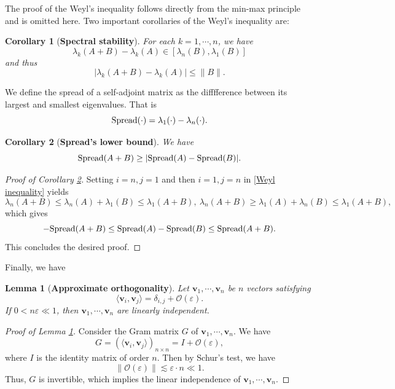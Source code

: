 \documentclass[11pt,reqno,UTF8,twoside]{amsart}
\newcommand{\bfv}{\mathbf{v}}
\newcommand{\spread}{{\rm Spread}}
\newcommand{\mcO}{\mathcal{O}}
\newtheorem{lem}[thm]{Lemma}
\newtheorem{cor}{\bf Corollary}[section]
\theoremstyle{definition}
\numberwithin{equation}{section}
\begin{document}
The proof of  the Weyl's inequality follows directly from the min-max principle  and is omitted here. Two important corollaries of  the Weyl's inequality are:
\begin{cor}[{\bf Spectral stability}]\label{Spectral stability lemma}
For each \(k = 1, \cdots, n\), we have
\[
\lambda_k(A + B) - \lambda_k(A) \in [\lambda_n(B), \lambda_1(B)]
\]
and thus 
\[
|\lambda_k(A + B) - \lambda_k(A)| \leq \|B\|.
\]
\end{cor}

We define the spread of a self-adjoint matrix as the difffference between its largest and smallest eigenvalues. That is  
\begin{equation}\label{definition of spread}
  \spread(\cdot)=\lambda_1(\cdot)-\lambda_n(\cdot).
\end{equation}
\begin{cor}[{\bf Spread's lower bound}]\label{spread lemma}
 We have 
  \[\spread(A+B)\geq |\spread(A)-\spread(B)|.\]
\end{cor}
\begin{proof}[Proof of Corollary \ref{spread lemma}]
  Setting $i=n,j=1$ and then $i=1,j=n$ in \eqref{Weyl inequality} yields 
  \[\lambda_n(A+B)\leq \lambda_n(A)+\lambda_1(B)\leq \lambda_1(A+B),\ \lambda_n(A+B)\geq \lambda_1(A)+\lambda_n(B)\leq \lambda_1(A+B), \]
  which  gives
  \[-\spread(A+B)\leq \spread(A)-\spread(B)\leq \spread(A+B).\]
  This concludes the desired proof. 
\end{proof}

Finally,  we have %
\begin{lem}[{\bf Approximate orthogonality}]\label{orthogonality lemma}
Let $\bfv_1,\cdots ,\bfv_n$ be $n$ vectors satisfying 
\[\langle \bfv_i,\bfv_j \rangle =\delta_{i,j}+\mcO(\varepsilon).\]
If $0<n\varepsilon\ll 1$, then $\bfv_1,\cdots ,\bfv_n$ are linearly independent.
\end{lem}
\begin{proof}[Proof of Lemma \ref{orthogonality lemma}]
  Consider the Gram matrix $G$ of $\bfv_1,\cdots ,\bfv_n$. We have 
  \[G=(\langle \bfv_i,\bfv_j \rangle)_{n\times n} =I+\mcO(\varepsilon),\]
  where $I$ is the identity matrix of order $n$. 
  Then by Schur's  test, we have 
  \[ \| \mcO(\varepsilon) \| \lesssim \varepsilon\cdot n\ll 1.\]
  Thus, $G$ is invertible, which implies the  linear  independence of $\bfv_1,\cdots ,\bfv_n$.



\end{proof}
\end{document}
